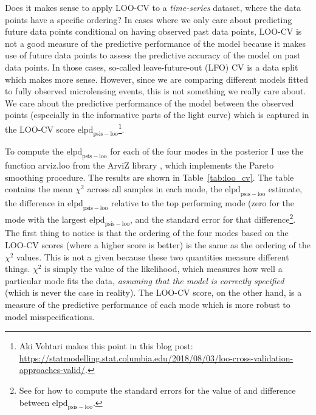 \documentclass[12pt,dvipsnames]{report}
\newcommand{\ssf}[1]{\textsf{#1}}
\begin{document}
Does it makes sense to apply LOO-CV to a \emph{time-series} dataset, where 
the data points have a specific ordering? In cases where we only care about 
predicting future data points conditional on having observed past data points, 
LOO-CV is not a good measure of the predictive performance of the model because it 
makes use of future data points to assess the predictive accuracy of the model on past data points. 
In those cases, so-called leave-future-out (LFO) CV \citep{arXiv:1902.06281} is a data split which 
makes more sense.
However, since we are comparing different models fitted to fully observed microlensing events, 
this is not something we really care about. We care about the predictive performance 
of the model between the observed points  (especially in the informative 
parts of the light curve) which is captured in the LOO-CV score 
$\mathrm{elpd}_\mathrm{psis-loo}$\footnote{Aki Vehtari makes this point in this blog post: 
\url{https://statmodelling.stat.columbia.edu/2018/08/03/loo-cross-validation-approaches-valid/}.}.

 To compute the $\mathrm{elpd}_\mathrm{psis-loo}$ for each of the four modes 
 in the posterior I use the function \ssf{arviz.loo} from the \ssf{ArviZ} library 
 \citep{arviz_2019}, which implements the Pareto smoothing procedure.  
 The results are shown in Table~\ref{tab:loo_cv}. The table contains the mean 
 $\chi^2$ across all samples in each mode, the $\mathrm{elpd}_\mathrm{psis-loo}$ estimate, the difference 
in $\mathrm{elpd}_\mathrm{psis-loo}$ relative to the top performing mode (zero
for the mode with the largest $\mathrm{elpd}_\mathrm{psis-loo}$, and the 
standard error for that difference\footnote{See \citet{vehtari2017} for how to compute
the standard errors for the value of and difference between 
$\mathrm{elpd}_\mathrm{psis-loo}$.}.  
The first thing to notice is that the ordering of the four modes based on the LOO-CV scores 
(where a higher score is better) is the same as the ordering of the $\chi^2$ values. 
This is not a given because these two quantities measure different things. 
$\chi^2$ is simply the value of the likelihood, 
which measures how well a particular mode fits the data, \emph{assuming that the model is 
correctly specified} (which is never the case in reality).
The LOO-CV score, on the other hand, is a measure of the predictive performance of each 
mode which is more robust to model misspecifications. 
\end{document}
